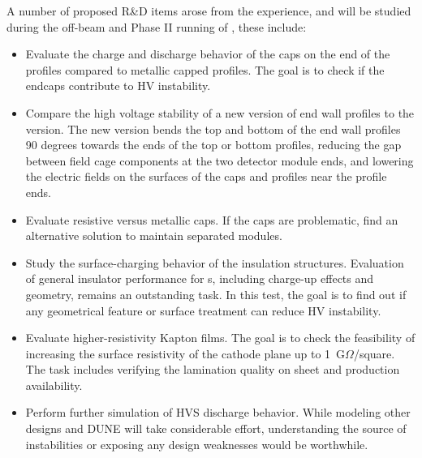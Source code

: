 A number of proposed R\&D items arose from the  experience, and will be studied during the off-beam and Phase II running of ,  these include:
\begin{itemize}
\item Evaluate the charge and discharge behavior of the  caps on the end of the profiles compared to metallic capped profiles.  The goal is to check if the endcaps contribute to HV instability. 
\item Compare the high voltage stability of a new version of end wall profiles to the  version.  The new version bends the top and bottom of the end wall profiles 90 degrees towards the ends of the top or bottom profiles, reducing the gap between field cage components at the two detector module ends, and lowering the electric fields on the surfaces of the  caps and profiles near the profile ends.
\item Evaluate resistive versus metallic caps.  If the  caps are %
problematic, find an alternative solution to maintain separated  modules.
\item Study the surface-charging behavior of the  insulation structures.  Evaluation of general insulator performance for \lartpc{}s, including charge-up effects and geometry, remains an outstanding task.  In this test, the goal is to find out if any geometrical feature or surface treatment can reduce HV instability.
\item Evaluate higher-resistivity Kapton films.  The goal is to check the feasibility of increasing the surface resistivity of the cathode plane up to 1~G$\Omega$/square.  The task includes verifying the lamination quality on \frfour sheet and production availability.
\item Perform further simulation of  HVS discharge behavior.   While modeling other  designs and DUNE will take considerable effort, %
understanding the source of instabilities or exposing any design weaknesses would be worthwhile. %
\end{itemize}

